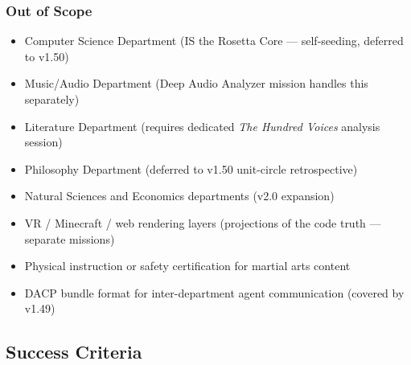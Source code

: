 \documentclass[11pt,letterpaper]{article}
\begin{document}
\subsubsection{Out of Scope}
\begin{itemize}[leftmargin=1.5em]
  \item Computer Science Department (IS the Rosetta Core --- self-seeding, deferred to v1.50)
  \item Music/Audio Department (Deep Audio Analyzer mission handles this separately)
  \item Literature Department (requires dedicated \textit{The Hundred Voices} analysis session)
  \item Philosophy Department (deferred to v1.50 unit-circle retrospective)
  \item Natural Sciences and Economics departments (v2.0 expansion)
  \item VR / Minecraft / web rendering layers (projections of the code truth --- separate missions)
  \item Physical instruction or safety certification for martial arts content
  \item DACP bundle format for inter-department agent communication (covered by v1.49)
\end{itemize}

\subsection{Success Criteria}
\end{document}

